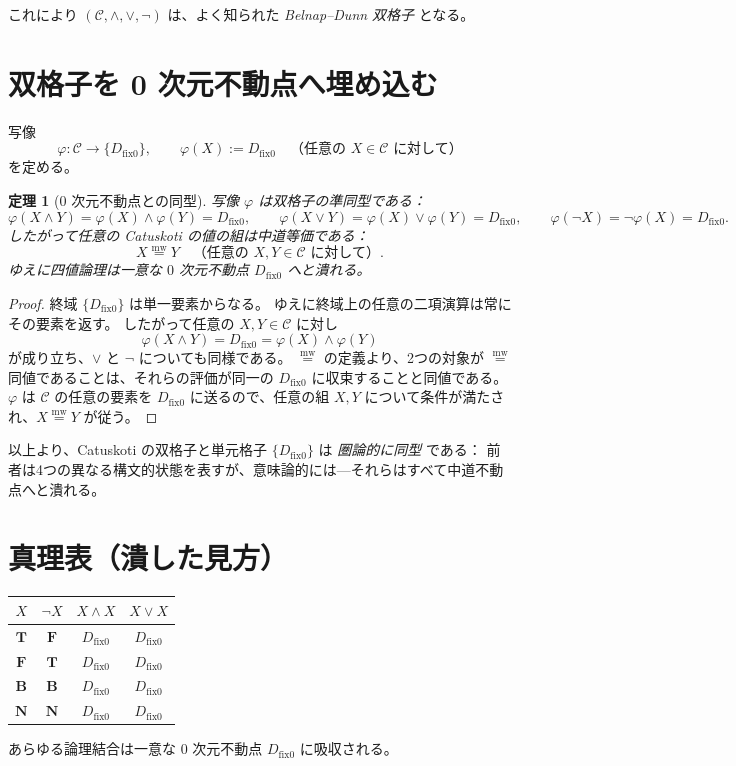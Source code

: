 \documentclass[12pt,a4paper]{article}
\newcommand{\dfix}{D_{\mathrm{fix}0}} %
\newcommand{\mw}{\mathrel{\overset{\mathrm{mw}}{=}}} %
\newcommand{\phiMap}{\varphi}            %
\newtheorem{theorem}{定理}[section]
\begin{document}
これにより $(\mathcal{C},\wedge,\vee,\neg)$ は、よく知られた \emph{Belnap–Dunn 双格子} となる。

\section{双格子を 0 次元不動点へ埋め込む}

写像
\begin{equation}
\phiMap:\mathcal{C}\longrightarrow\{\dfix\},
\qquad
\phiMap(X):=\dfix\quad\text{（任意の }X\in\mathcal{C}\text{ に対して）}
\tag{1}
\end{equation}
を定める。

\begin{theorem}[$0$ 次元不動点との同型]
写像 $\phiMap$ は双格子の準同型である：
$$
\phiMap(X\wedge Y)=\phiMap(X)\wedge\phiMap(Y)=\dfix,
\qquad
\phiMap(X\vee Y)=\phiMap(X)\vee\phiMap(Y)=\dfix,
\qquad
\phiMap(\neg X)=\neg\phiMap(X)=\dfix.
$$
したがって任意の Catuskoti の値の組は中道等価である：
$$
X\mw Y\quad\text{（任意の }X,Y\in\mathcal{C}\text{ に対して）}.
$$
ゆえに四値論理は一意な $0$ 次元不動点 $\dfix$ へと潰れる。
\end{theorem}
\begin{proof}
終域 $\{\dfix\}$ は単一要素からなる。
ゆえに終域上の任意の二項演算は常にその要素を返す。
したがって任意の $X,Y\in\mathcal{C}$ に対し
$$
\phiMap(X\wedge Y)=\dfix=\phiMap(X)\wedge\phiMap(Y)
$$
が成り立ち、$\vee$ と $\neg$ についても同様である。
$\mw$ の定義より、2つの対象が $\mw$ 同値であることは、それらの評価が同一の $\dfix$ に収束することと同値である。
$\phiMap$ は $\mathcal{C}$ の任意の要素を $\dfix$ に送るので、任意の組 $X,Y$ について条件が満たされ、$X\mw Y$ が従う。
\end{proof}

以上より、Catuskoti の双格子と単元格子 $\{\dfix\}$ は \emph{圏論的に同型} である：
前者は4つの異なる構文的状態を表すが、意味論的には—それらはすべて中道不動点へと潰れる。

\section{真理表（潰した見方）}

\begin{center}
\begin{tabular}{c|c|c|c}
$X$ & $\neg X$ & $X\wedge X$ & $X\vee X$ \\ \hline
$\mathbf{T}$ & $\mathbf{F}$ & $\dfix$ & $\dfix$ \\
$\mathbf{F}$ & $\mathbf{T}$ & $\dfix$ & $\dfix$ \\
$\mathbf{B}$ & $\mathbf{B}$ & $\dfix$ & $\dfix$ \\
$\mathbf{N}$ & $\mathbf{N}$ & $\dfix$ & $\dfix$
\end{tabular}
\end{center}
あらゆる論理結合は一意な $0$ 次元不動点 $\dfix$ に吸収される。
\end{document}
